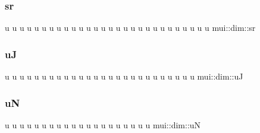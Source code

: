 \mbox{\label{namespacemui_1_1dim_a3cf7f5a09f87d2ab1b53eade861a1a17}} 
\subsubsection{\texorpdfstring{sr}{sr}}
{\footnotesize\ttfamily u u u u u u u u u u u u u u u u u u u u u u u u u u u u mui\+::dim\+::sr}

\mbox{\label{namespacemui_1_1dim_a0fe972a1aaf2a7eb078e0883682a5434}} 
\subsubsection{\texorpdfstring{uJ}{uJ}}
{\footnotesize\ttfamily u u u u u u u u u u u u u u u u u u u u u u u u u u mui\+::dim\+::uJ}

\mbox{\label{namespacemui_1_1dim_a1aef70c16f2a65b9bc88c6f35245b805}} 
\subsubsection{\texorpdfstring{uN}{uN}}
{\footnotesize\ttfamily u u u u u u u u u u u u u u u u u u u u mui\+::dim\+::uN}

